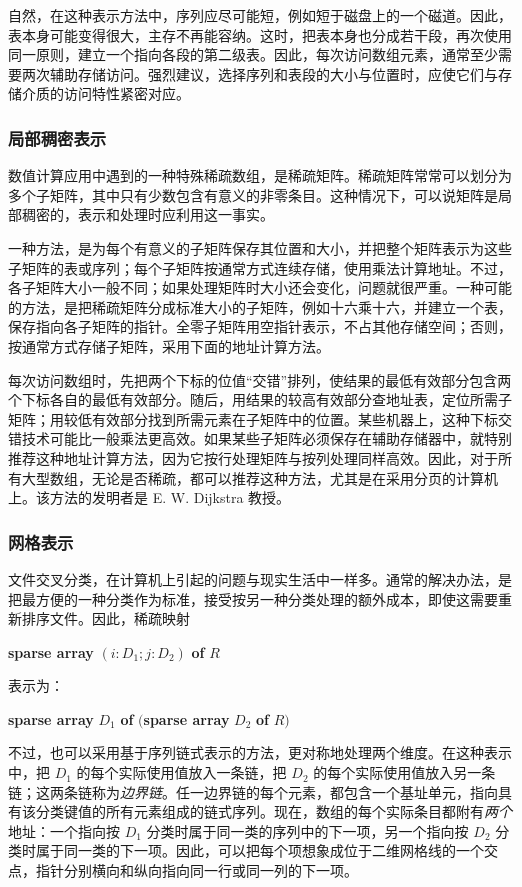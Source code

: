 \documentclass[twoside,11pt,fontset=none]{ctexbook}
\begin{document}
自然，在这种表示方法中，序列应尽可能短，例如短于磁盘上的一个磁道。因此，表本身可能变得很大，主存不再能容纳。这时，把表本身也分成若干段，再次使用同一原则，建立一个指向各段的第二级表。因此，每次访问数组元素，通常至少需要两次辅助存储访问。强烈建议，选择序列和表段的大小与位置时，应使它们与存储介质的访问特性紧密对应。

\subsubsection{局部稠密表示}

数值计算应用中遇到的一种特殊稀疏数组，是稀疏矩阵。稀疏矩阵常常可以划分为多个子矩阵，其中只有少数包含有意义的非零条目。这种情况下，可以说矩阵是局部稠密的，表示和处理时应利用这一事实。

一种方法，是为每个有意义的子矩阵保存其位置和大小，并把整个矩阵表示为这些子矩阵的表或序列；每个子矩阵按通常方式连续存储，使用乘法计算地址。不过，各子矩阵大小一般不同；如果处理矩阵时大小还会变化，问题就很严重。一种可能的方法，是把稀疏矩阵分成标准大小的子矩阵，例如十六乘十六，并建立一个表，保存指向各子矩阵的指针。全零子矩阵用空指针表示，不占其他存储空间；否则，按通常方式存储子矩阵，采用下面的地址计算方法。

每次访问数组时，先把两个下标的位值“交错”排列，使结果的最低有效部分包含两个下标各自的最低有效部分。随后，用结果的较高有效部分查地址表，定位所需子矩阵；用较低有效部分找到所需元素在子矩阵中的位置。某些机器上，这种下标交错技术可能比一般乘法更高效。如果某些子矩阵必须保存在辅助存储器中，就特别推荐这种地址计算方法，因为它按行处理矩阵与按列处理同样高效。因此，对于所有大型数组，无论是否稀疏，都可以推荐这种方法，尤其是在采用分页的计算机上。该方法的发明者是 E. W. Dijkstra 教授。

\subsubsection{网格表示}

文件交叉分类，在计算机上引起的问题与现实生活中一样多。通常的解决办法，是把最方便的一种分类作为标准，接受按另一种分类处理的额外成本，即使这需要重新排序文件。因此，稀疏映射

\quad \textbf{sparse array} $(i:D_1; j:D_2)$ \textbf{of} $R$

\noindent
表示为：

\quad \textbf{sparse array} $D_1$ \textbf{of} $($\textbf{sparse array} $D_2$ \textbf{of} $R)$

不过，也可以采用基于序列链式表示的方法，更对称地处理两个维度。在这种表示中，把 $D_1$ 的每个实际使用值放入一条链，把 $D_2$ 的每个实际使用值放入另一条链；这两条链称为\textit{边界链}。任一边界链的每个元素，都包含一个基址单元，指向具有该分类键值的所有元素组成的链式序列。现在，数组的每个实际条目都附有\textit{两个}地址：一个指向按 $D_1$ 分类时属于同一类的序列中的下一项，另一个指向按 $D_2$ 分类时属于同一类的下一项。因此，可以把每个项想象成位于二维网格线的一个交点，指针分别横向和纵向指向同一行或同一列的下一项。
\end{document}
